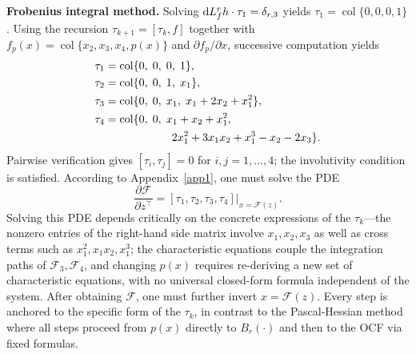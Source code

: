 \documentclass[11pt]{article}
\DeclareMathOperator{\col}{col}
\begin{document}
\textbf{Frobenius integral method.}
Solving ${\rm d}L_f^{r}h\cdot\tau_1=\delta_{r,3}$ yields $\tau_1=\col\{0,0,0,1\}$. Using the recursion $\tau_{k+1}=[\tau_k,f]$ together with $f_p(x)=\col\{x_2,x_3,x_4,p(x)\}$ and $\partial f_p/\partial x$, successive computation yields
\begin{align*}
	\tau_1&=\col\{0,\;0,\;0,\;1\},\\
	\tau_2&=\col\{0,\;0,\;1,\;x_1\},\\
	\tau_3&=\col\{0,\;0,\;x_1,\;x_1+2x_2+x_1^2\},\\
	\tau_4&=\col\{0,\;0,\;x_1+x_2+x_1^2,\notag\\
	&\qquad\qquad\qquad2x_1^2+3x_1x_2+x_1^3-x_2-2x_3\}.
\end{align*}
Pairwise verification gives $[\tau_i,\tau_j]=0$ for $i,j=1,\ldots,4$; the involutivity condition is satisfied. According to Appendix~\ref{app1}, one must solve the PDE
\begin{equation}\label{eq:ex-PDE}
	\frac{\partial\mathcal{F}}{\partial z^\top}=[\tau_1,\tau_2,\tau_3,\tau_4]\big|_{x=\mathcal{F}(z)}.
\end{equation}
Solving this PDE depends critically on the concrete expressions of the $\tau_k$---the nonzero entries of the right-hand side matrix involve $x_1,x_2,x_3$ as well as cross terms such as $x_1^2,x_1x_2,x_1^3$; the characteristic equations couple the integration paths of $\mathcal{F}_3,\mathcal{F}_4$, and changing $p(x)$ requires re-deriving a new set of characteristic equations, with no universal closed-form formula independent of the system. After obtaining $\mathcal{F}$, one must further invert $x=\mathcal{F}(z)$. Every step is anchored to the specific form of the $\tau_k$, in contrast to the Pascal-Hessian method where all steps proceed from $p(x)$ directly to $B_r(\cdot)$ and then to the OCF via fixed formulas.
\end{document}
